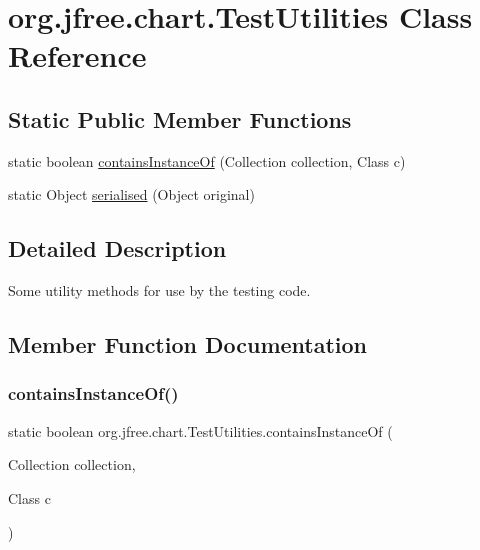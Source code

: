 \hypertarget{classorg_1_1jfree_1_1chart_1_1_test_utilities}{}\section{org.\+jfree.\+chart.\+Test\+Utilities Class Reference}
\label{classorg_1_1jfree_1_1chart_1_1_test_utilities}
\subsection*{Static Public Member Functions}
\begin{DoxyCompactItemize}
\item 
static boolean \mbox{\hyperlink{classorg_1_1jfree_1_1chart_1_1_test_utilities_ac0772f4da23a53d393e0d37120d67a0d}{contains\+Instance\+Of}} (Collection collection, Class c)
\item 
static Object \mbox{\hyperlink{classorg_1_1jfree_1_1chart_1_1_test_utilities_a07bff6b8c9ae8560a08797ac377d8d91}{serialised}} (Object original)
\end{DoxyCompactItemize}


\subsection{Detailed Description}
Some utility methods for use by the testing code. 

\subsection{Member Function Documentation}
\mbox{\label{classorg_1_1jfree_1_1chart_1_1_test_utilities_ac0772f4da23a53d393e0d37120d67a0d}} 
\subsubsection{\texorpdfstring{contains\+Instance\+Of()}{containsInstanceOf()}}
{\footnotesize\ttfamily static boolean org.\+jfree.\+chart.\+Test\+Utilities.\+contains\+Instance\+Of (\begin{DoxyParamCaption}\item[{Collection}]{collection,  }\item[{Class}]{c }\end{DoxyParamCaption})\hspace{0.3cm}{\ttfamily [static]}}

